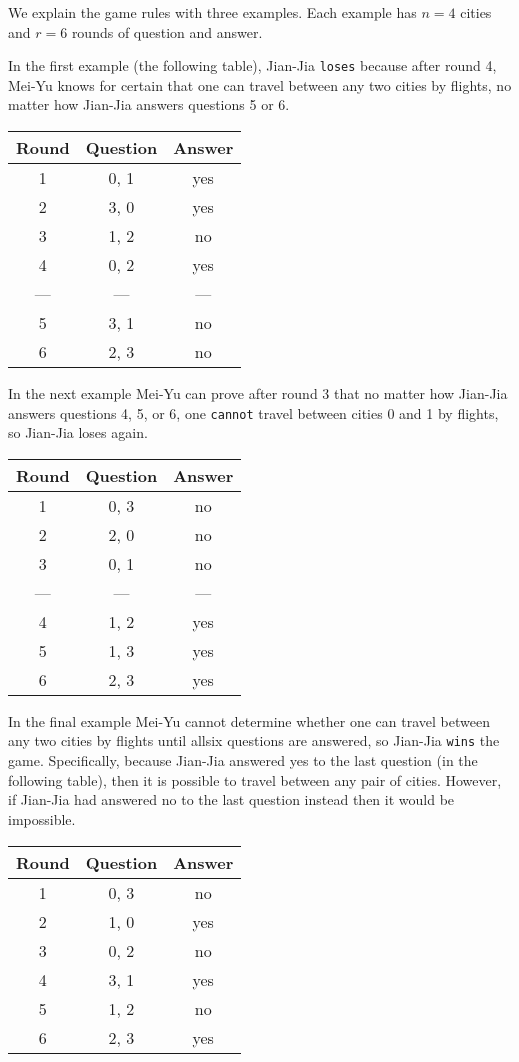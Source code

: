We explain the game rules with three examples. Each example has $n = 4$ cities and $r = 6$ rounds of question and answer.

In the first example (the following table), Jian-Jia \texttt{loses} because after round 4, Mei-Yu knows for certain that one can travel between any two cities by flights, no matter how Jian-Jia answers questions 5 or 6.

\begin{center}
\renewcommand{\arraystretch}{1.5}
\begin{tabular}{|c|c|c|}
\hline
Round & Question & Answer \\
\hline
1 &  0, 1 & yes\\
\hline
2 &  3, 0 & yes\\
\hline
3 &  1, 2 & no\\
\hline
4 &  0, 2 & yes\\
\hline
--- &  --- & ---\\
\hline
5 &  3, 1 & no\\
\hline
6 &  2, 3 & no\\
\hline
\end{tabular}
\end{center}

In the next example Mei-Yu can prove after round 3 that no matter how Jian-Jia answers questions 4, 5, or 6, one \texttt{cannot} travel between cities 0 and 1 by flights, so Jian-Jia loses again.

\begin{center}
\renewcommand{\arraystretch}{1.5}
\begin{tabular}{|c|c|c|}
\hline
Round & Question & Answer \\
\hline
1 &  0, 3 & no\\
\hline
2 &  2, 0 & no\\
\hline
3 &  0, 1 & no\\
\hline
--- &  --- & ---\\
\hline
4 &  1, 2 & yes\\
\hline
5 &  1, 3 & yes\\
\hline
6 &  2, 3 & yes\\
\hline
\end{tabular}
\end{center}

In the final example Mei-Yu cannot determine whether one can travel between any two cities by flights until allsix questions are answered, so Jian-Jia \texttt{wins} the game. Specifically, because Jian-Jia answered yes to the last question (in the following table), then it is possible to travel between any pair of cities. However, if Jian-Jia had answered no to the last question instead then it would be impossible.

\begin{center}
\renewcommand{\arraystretch}{1.5}
\begin{tabular}{|c|c|c|}
\hline
Round & Question & Answer \\
\hline
1 &  0, 3 & no\\
\hline
2 &  1, 0 & yes\\
\hline
3 &  0, 2 & no\\
\hline
4 &  3, 1 & yes\\
\hline
5 &  1, 2 & no\\
\hline
6 &  2, 3 & yes\\
\hline
\end{tabular}
\end{center}